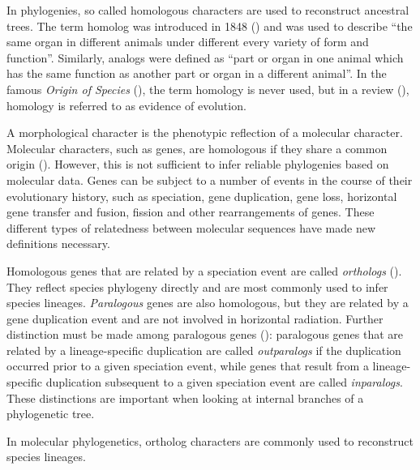 In phylogenies, so called homologous characters are used to reconstruct
ancestral trees. The term homolog was introduced in 1848 (\cite{owen1848}) and
was used to describe ``the same organ in different animals under different every
variety of form and function''. Similarly, analogs were defined as ``part or
organ in one animal which has the same function as another part or organ in a
different animal''. In the famous \emph{Origin of Species} (\cite{darwin1859}),
the term homology is never used, but in a review (\cite{owen1860}), homology is
referred to as evidence of evolution.

A morphological character is the phenotypic reflection of a molecular character.
Molecular characters, such as genes, are homologous if they share a common
origin (\cite{koonin2005}). However, this is not sufficient to infer reliable
phylogenies based on molecular data. Genes can be subject to a number of events
in the course of their evolutionary history, such as speciation, gene
duplication, gene loss, horizontal gene transfer and fusion, fission and other
rearrangements of genes. These different types of relatedness between molecular
sequences have made new definitions necessary.

Homologous genes that are related by a speciation event are called
\emph{orthologs} (\cite{fitch1970}). They reflect species phylogeny directly and
are most commonly used to infer species lineages. \emph{Paralogous} genes are
also homologous, but they are related by a gene duplication event and are not
involved in horizontal radiation. Further distinction must be made among
paralogous genes (\cite{sonnhammer2002}): paralogous genes that are related by a
lineage-specific duplication are called \emph{outparalogs} if the duplication
occurred prior to a given speciation event, while genes that result from a
lineage-specific duplication subsequent to a given speciation event are called
\emph{inparalogs}.  These distinctions are important when looking at internal
branches of a phylogenetic tree.

In molecular phylogenetics, ortholog characters are commonly used to reconstruct
species lineages. 
